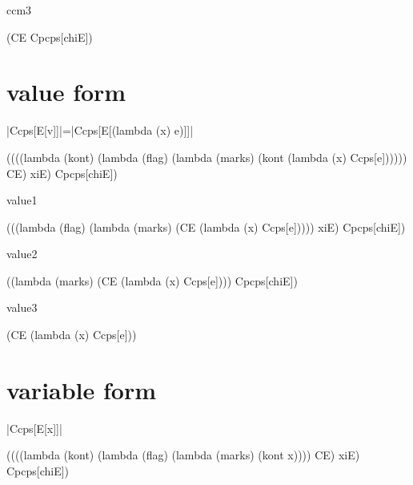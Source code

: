 \noindent
ccm3

\begin{schemeblock}
\begin{schemedisplay}
(CE Cpcps[chiE])
\end{schemedisplay}
\end{schemeblock}

\section{value form}

\noindent
\scheme|Ccps[E[v]]|=\scheme|Ccps[E[(lambda (x) e)]]|

\begin{schemeblock}
\begin{schemedisplay}
((((lambda (kont)
     (lambda (flag)
       (lambda (marks)
         (kont (lambda (x) Ccps[e])))))
   CE) xiE) Cpcps[chiE])
\end{schemedisplay}
\end{schemeblock}

\noindent
value1

\begin{schemeblock}
\begin{schemedisplay}
(((lambda (flag)
    (lambda (marks)
      (CE (lambda (x) Ccps[e]))))
  xiE) Cpcps[chiE])
\end{schemedisplay}
\end{schemeblock}

\noindent
value2

\begin{schemeblock}
\begin{schemedisplay}
((lambda (marks)
   (CE (lambda (x) Ccps[e])))
 Cpcps[chiE])
\end{schemedisplay}
\end{schemeblock}

\noindent
value3

\begin{schemeblock}
\begin{schemedisplay}
(CE (lambda (x) Ccps[e]))
\end{schemedisplay}
\end{schemeblock}

\section{variable form}

\noindent
\scheme|Ccps[E[x]]|
\begin{schemeblock}
\begin{schemedisplay}
((((lambda (kont)
     (lambda (flag)
       (lambda (marks)
         (kont x))))
   CE) xiE) Cpcps[chiE])
\end{schemedisplay}
\end{schemeblock}

